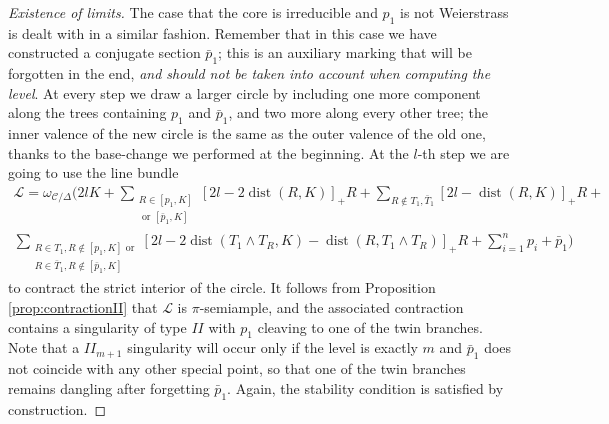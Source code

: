 \documentclass{compositio}
\newcommand{\dvr}{\Delta}
\newcommand{\dist}{\operatorname{dist}}
\theoremstyle{plain}
\theoremstyle{definition}
\theoremstyle{remark}
\begin{document}
\begin{proof}[Existence of limits]
  The case that the core is irreducible and $p_1$ is not Weierstrass is dealt with in a similar fashion. Remember that in this case we have constructed a conjugate section $\bar p_1$; this is an auxiliary marking that will be forgotten in the end, \emph{and should not be taken into account when computing the level}. At every step we draw a larger circle by including one more component along the trees containing $p_1$ and $\bar p_1$, and two more along every other tree; the inner valence of the new circle is the same as the outer valence of the old one, thanks to the base-change we performed at the beginning. At the $l$-th step we are going to use the line bundle
  \begin{multline*}
  \mathcal L=\omega_{\mathcal C/\dvr}(2l K + \sum_{\substack{R\in [p_1,K]\\ \text{ or }[\bar p_1,K]}}[2l-2\dist(R,K)]_+R +\sum_{R\notin T_1,\bar T_1}[2l-\dist(R,K)]_+R +\\
  \sum_{\substack{R\in T_1,R\notin [p_1,K]\text{ or} \\ R\in \bar T_1,R\notin [\bar p_1,K]}}[2l-2\dist(T_1\wedge T_R,K)-\dist(R,T_1\wedge T_R)]_+R+ \sum_{i=1}^np_i+\bar p_1)
  \end{multline*}
  to contract the strict interior of the circle. It follows from Proposition \ref{prop:contractionII} that $\mathcal L$ is $\pi$-semiample, and the associated contraction contains a singularity of type $I\!I$ with $p_1$ cleaving to one of the twin branches. Note that a $I\!I_{m+1}$ singularity will occur only if the level is exactly $m$ and $\bar p_1$ does not coincide with any other special point, so that one of the twin branches remains dangling after forgetting $\bar p_1$. Again, the stability condition is satisfied by construction.
  
  \smallskip
  

\end{proof}
\end{document}

